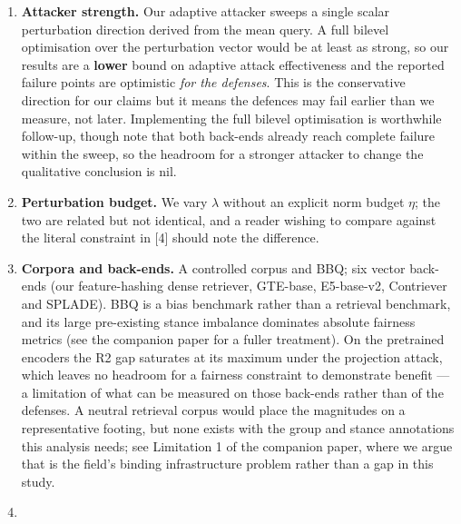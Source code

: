 \documentclass[review,3p,times]{elsarticle}
\newcounter{none}
\providecommand{\tightlist}{%
  \setlength{\itemsep}{0pt}\setlength{\parskip}{0pt}}
\begin{document}
\begin{enumerate}
\def\labelenumi{\arabic{enumi}.}
\tightlist
\item
  \textbf{Attacker strength.} Our adaptive attacker sweeps a single scalar perturbation direction derived from the mean query. A full bilevel optimisation over the perturbation vector would be at least as strong, so our results are a \textbf{lower} bound on adaptive attack effectiveness and the reported failure points are optimistic \emph{for the defenses}. This is the conservative direction for our claims but it means the defences may fail earlier than we measure, not later. Implementing the full bilevel optimisation is worthwhile follow-up, though note that both back-ends already reach complete failure within the sweep, so the headroom for a stronger attacker to change the qualitative conclusion is nil.
\item
  \textbf{Perturbation budget.} We vary \(\lambda\) without an explicit norm budget \(\eta\); the two are related but not identical, and a reader wishing to compare against the literal constraint in {[}4{]} should note the difference.
\item
  \textbf{Corpora and back-ends.} A controlled corpus and BBQ; six vector back-ends (our feature-hashing dense retriever, GTE-base, E5-base-v2, Contriever and SPLADE). BBQ is a bias benchmark rather than a retrieval benchmark, and its large pre-existing stance imbalance dominates absolute fairness metrics (see the companion paper for a fuller treatment). On the pretrained encoders the R2 gap saturates at its maximum under the projection attack, which leaves no headroom for a fairness constraint to demonstrate benefit --- a limitation of what can be measured on those back-ends rather than of the defenses. A neutral retrieval corpus would place the magnitudes on a representative footing, but none exists with the group and stance annotations this analysis needs; see Limitation 1 of the companion paper, where we argue that is the field's binding infrastructure problem rather than a gap in this study.
\item

\end{enumerate}
\end{document}
